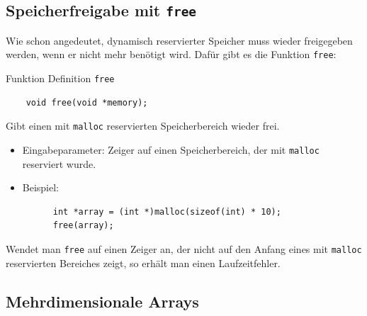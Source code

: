 \subsection{Speicherfreigabe mit \texttt{free}}

Wie schon angedeutet, dynamisch reservierter Speicher muss wieder freigegeben werden, wenn er nicht mehr benötigt wird.
Dafür gibt es die Funktion \verb|free|:
\begin{mydefinitionblock}{Funktion Definition \texttt{free}}
  \begin{lstlisting}
    void free(void *memory);
  \end{lstlisting}
  Gibt einen mit \verb|malloc| reservierten Speicherbereich wieder frei.
  \begin{itemize}
  \item Eingabeparameter: Zeiger auf einen Speicherbereich, der mit \verb|malloc| reserviert wurde.
  \item Beispiel:
    \begin{lstlisting}
      int *array = (int *)malloc(sizeof(int) * 10);
      free(array);
    \end{lstlisting}
  \end{itemize}
\end{mydefinitionblock}
Wendet man \verb|free| auf einen Zeiger an, der nicht auf den Anfang eines mit \verb|malloc| reservierten Bereiches zeigt, so erhält man einen Laufzeitfehler.

\subsection{Mehrdimensionale Arrays}

